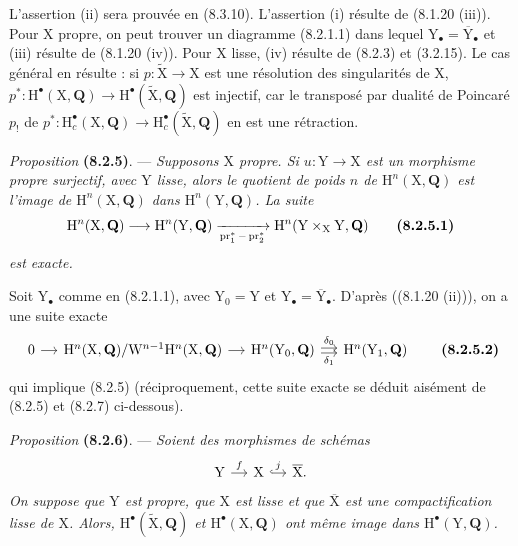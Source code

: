 \documentclass[11pt,leqno]{article}
\begin{document}
L’assertion (ii) sera prouvée en (8.3.10). L’assertion (i) résulte de (8.1.20 (iii)). Pour \(\mathrm{X}\) propre, on peut trouver un diagramme (8.2.1.1) dans lequel \(\mathrm{Y}_\bullet=\overline{\mathrm{Y}}_\bullet\) et (iii) résulte de (8.1.20 (iv)). Pour \(\mathrm{X}\) lisse, (iv) résulte de (8.2.3) et (3.2.15). Le cas général en résulte : si \(p:\widetilde{\mathrm{X}}\to\mathrm{X}\) est une résolution des singularités de \(\mathrm{X}\), \(p^*:\mathrm{H}^\bullet(\mathrm{X},\mathbf{Q})\to\mathrm{H}^\bullet(\widetilde{\mathrm{X}},\mathbf{Q})\) est injectif, car le transposé par dualité de Poincaré \(p_!\) de \(p^*:\mathrm{H}_c^\bullet(\mathrm{X},\mathbf{Q})\to\mathrm{H}_c^\bullet(\widetilde{\mathrm{X}},\mathbf{Q})\) en est une rétraction.

\textit{Proposition} \textbf{(8.2.5)}. — \textit{Supposons \(\mathrm{X}\) propre. Si \(u:\mathrm{Y}\to\mathrm{X}\) est un morphisme propre surjectif, avec \(\mathrm{Y}\) lisse, alors le quotient de poids \(n\) de \(\mathrm{H}^n(\mathrm{X},\mathbf{Q})\) est l’image de \(\mathrm{H}^n(\mathrm{X},\mathbf{Q})\) dans \(\mathrm{H}^n(\mathrm{Y},\mathbf{Q})\). La suite}
\[
\mathrm{H}^n(\mathrm{X},\mathbf{Q})
\longrightarrow
\mathrm{H}^n(\mathrm{Y},\mathbf{Q})
\xrightarrow[\operatorname{pr}_1^*-\operatorname{pr}_2^*]{}
\mathrm{H}^n(\mathrm{Y}\times_{\mathrm{X}}\mathrm{Y},\mathbf{Q})
\tag*{\textbf{(8.2.5.1)}}
\]
\textit{est exacte.}

Soit \(\mathrm{Y}_\bullet\) comme en (8.2.1.1), avec \(\mathrm{Y}_0=\mathrm{Y}\) et \(\mathrm{Y}_\bullet=\overline{\mathrm{Y}}_\bullet\). D’après ((8.1.20 (ii))), on a une suite exacte
\[
\begin{tikzcd}[column sep=small]
0 \arrow[r]
 & \mathrm{H}^n(\mathrm{X},\mathbf{Q})/
   \mathrm{W}^{n-1}\mathrm{H}^n(\mathrm{X},\mathbf{Q}) \arrow[r]
 & \mathrm{H}^n(\mathrm{Y}_0,\mathbf{Q})
   \arrow[r,shift left=.4ex,"\delta_0"]
   \arrow[r,shift right=.4ex,"\delta_1"']
 & \mathrm{H}^n(\mathrm{Y}_1,\mathbf{Q})
\end{tikzcd}
\tag*{\textbf{(8.2.5.2)}}
\]
qui implique (8.2.5) (réciproquement, cette suite exacte se déduit aisément de (8.2.5) et (8.2.7) ci-dessous).

\textit{Proposition} \textbf{(8.2.6)}. — \textit{Soient des morphismes de schémas}
\[
\begin{tikzcd}[column sep=small]
\mathrm{Y} \arrow[r,"f"]
 & \mathrm{X} \arrow[r,hook,"j"]
 & \overline{\mathrm{X}}.
\end{tikzcd}
\]
\textit{On suppose que \(\mathrm{Y}\) est propre, que \(\mathrm{X}\) est lisse et que \(\overline{\mathrm{X}}\) est une compactification lisse de \(\mathrm{X}\). Alors, \(\mathrm{H}^\bullet(\widetilde{\mathrm{X}},\mathbf{Q})\) et \(\mathrm{H}^\bullet(\mathrm{X},\mathbf{Q})\) ont même image dans \(\mathrm{H}^\bullet(\mathrm{Y},\mathbf{Q})\).}
\end{document}
